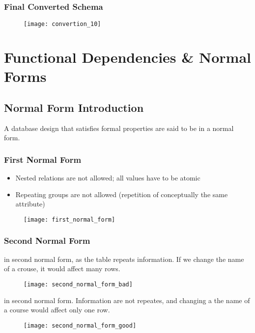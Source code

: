 \subsection{Final Converted Schema}

\begin{figure}[H]
    \centering
    \texttt{[image: convertion\_10]}
\end{figure}

\chapter{Functional Dependencies \& Normal Forms}

\section{Normal Form Introduction}

A database design that satisfies formal properties are said to be in a normal form.

\subsection{First Normal Form}

\begin{itemize}
    \item Nested relations are not allowed; all values have to be atomic
    \item Repeating groups are not allowed (repetition of conceptually the same attribute)
\end{itemize}

\begin{figure}[H]
    \centering
    \texttt{[image: first\_normal\_form]}
\end{figure}

\subsection{Second Normal Form}

\begin{minipage}[t]{0.48\textwidth}
 in second normal form, as the table repeats information. If we change the name of a crouse, it would affect many rows.
\begin{figure}[H]
    \centering
    \texttt{[image: second\_normal\_form\_bad]}
\end{figure}
\end{minipage}
\hfill
\begin{minipage}[t]{0.48\textwidth}
 in second normal form. Information are not repeates, and changing a the name of a course would affect only one row.
\begin{figure}[H]
    \centering
    \texttt{[image: second\_normal\_form\_good]}
\end{figure}
\end{minipage}


